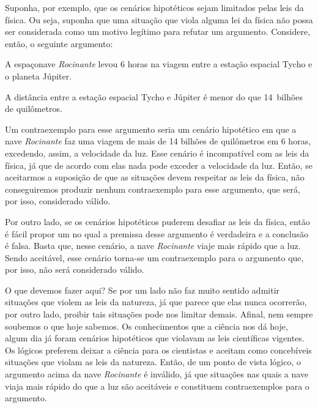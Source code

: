 Suponha, por exemplo, que os cenários hipotéticos sejam limitados pelas leis da física.
Ou seja, suponha que uma situação que viola alguma lei da física não possa ser considerada como um motivo legítimo para refutar um argumento.
Considere, então, o seguinte argumento:
	\begin{earg}
		\item[] A espaçonave \emph{Rocinante} levou 6 horas na viagem entre a estação espacial Tycho e o planeta Júpiter.
		\item[\therefore] A distância entre a estação espacial Tycho e Júpiter é menor do que 14~bilhões de quilômetros.
	\end{earg}
Um contraexemplo para esse argumento seria um cenário hipotético em que a nave \emph{Rocinante} faz uma viagem de mais de 14 bilhões de quilômetros em 6 horas, excedendo, assim, a velocidade da luz.
Esse cenário é incompatível com as leis da física, já que de acordo com elas nada pode exceder a velocidade da luz.
Então, se aceitarmos a suposição de que as situações devem respeitar as leis da física, não conseguiremos produzir nenhum contraexemplo para esse argumento, que será, por isso, considerado válido.

Por outro lado, se os cenários hipotéticos puderem desafiar as leis da física, então é fácil propor um no qual a premissa desse argumento é verdadeira e a conclusão é falsa.
Basta que, nesse cenário, a nave \emph{Rocinante} viaje mais rápido que a luz.
Sendo aceitável, esse cenário torna-se um contraexemplo para o argumento que, por isso, não será considerado válido.

O que devemos fazer aqui?
Se por um lado não faz muito sentido admitir situações que violem as leis da natureza, já que parece que elas nunca ocorrerão, por outro lado, proibir tais situações pode nos limitar demais.
Afinal, nem sempre soubemos o que hoje sabemos.
Os conhecimentos que a ciência nos dá hoje, algum dia já foram cenários hipotéticos que violavam as leis científicas vigentes.
Os lógicos preferem deixar a ciência para os cientistas e aceitam como concebíveis situações que violam as leis da natureza.
Então, de um ponto de vista lógico, o argumento acima da nave \textit{Rocinante} é inválido, já que situações nas quais a nave viaja mais rápido do que a luz são aceitáveis e constituem contraexemplos para o argumento.


